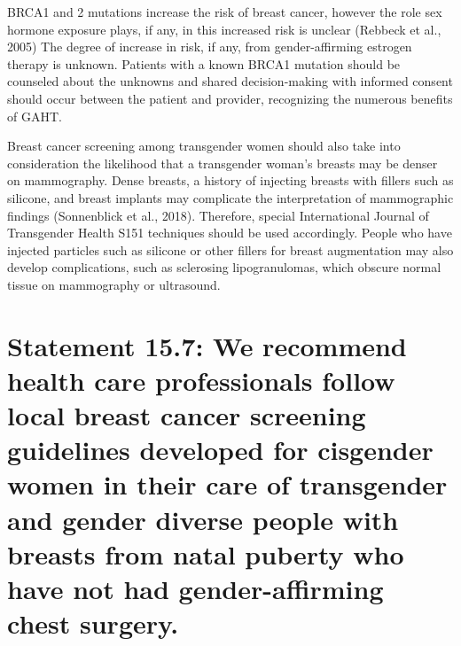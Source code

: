 \documentclass[
]{book}
\begin{document}
BRCA1 and 2 mutations increase the risk of
breast cancer, however the role sex hormone
exposure plays, if any, in this increased risk is
unclear (Rebbeck et al., 2005) The degree of
increase in risk, if any, from gender-affirming
estrogen therapy is unknown. Patients with a
known BRCA1 mutation should be counseled
about the unknowns and shared decision-making
with informed consent should occur between the
patient and provider, recognizing the numerous
benefits of GAHT.

Breast cancer screening among transgender
women should also take into consideration the
likelihood that a transgender woman's breasts may
be denser on mammography. Dense breasts, a
history of injecting breasts with fillers such as
silicone, and breast implants may complicate the
interpretation of mammographic findings
(Sonnenblick et al., 2018). Therefore, special
International Journal of Transgender Health S151
techniques should be used accordingly. People
who have injected particles such as silicone or
other fillers for breast augmentation may also
develop complications, such as sclerosing lipogranulomas, which obscure normal tissue on mammography or ultrasound.

\hypertarget{statement-15.7-we-recommend-health-care-professionals-follow-local-breast-cancer-screening-guidelines-developed-for-cisgender-women-in-their-care-of-transgender-and-gender-diverse-people-with-breasts-from-natal-puberty-who-have-not-had-gender-affirming-chest-surgery.}{%
\section*{Statement 15.7: We recommend health care professionals follow local breast cancer screening guidelines developed for cisgender women in their care of transgender and gender diverse people with breasts from natal puberty who have not had gender-affirming chest surgery.}\label{statement-15.7-we-recommend-health-care-professionals-follow-local-breast-cancer-screening-guidelines-developed-for-cisgender-women-in-their-care-of-transgender-and-gender-diverse-people-with-breasts-from-natal-puberty-who-have-not-had-gender-affirming-chest-surgery.}}
\end{document}
